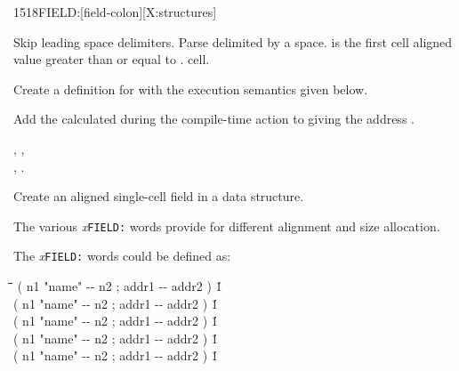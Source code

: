 \newpage
\begin{worddef}{1518}{FIELD:}[field-colon][X:structures]
\item {}

	Skip leading space delimiters. Parse  delimited by
	a space.  is the first cell aligned value greater
	than or equal to .   cell.

	Create a definition for  with the execution semantics
	given below.

\execute[name]

	Add the  calculated during the compile-time action
	to  giving the address .

\see {},
	, \\
	,
	.

	\begin{rationale}
		Create an aligned single-cell field in a data structure.

		The various \emph{x}\texttt{FIELD:} words provide for different
		alignment and size allocation.

		The \emph{x}\texttt{FIELD:} words could be defined as:

		\begin{tabbing}
			\tab \= \tab[6] \= \tab[22] \= \tab[5] \= \tab[5.2] \= \kill
			\> \word{:}    \>( n1 "name" -{}- n2 ; addr1 -{}- addr2 )\>    \' 1    \>  \word{;} \\
			\> \word{:}   \>( n1 "name" -{}- n2 ; addr1 -{}- addr2 )\>                  \' 1    \>  \word{;} \\
			\> \word{:}   \>( n1 "name" -{}- n2 ; addr1 -{}- addr2 )\>   \' 1   \>  \word{;} \\
			\> \word{:}  \>( n1 "name" -{}- n2 ; addr1 -{}- addr2 )\>  \' 1  \>  \word{;} \\
			\> \word{:}  \>( n1 "name" -{}- n2 ; addr1 -{}- addr2 )\>  \' 1  \>  \word{;}
		\end{tabbing}
	\end{rationale}
\end{worddef}

